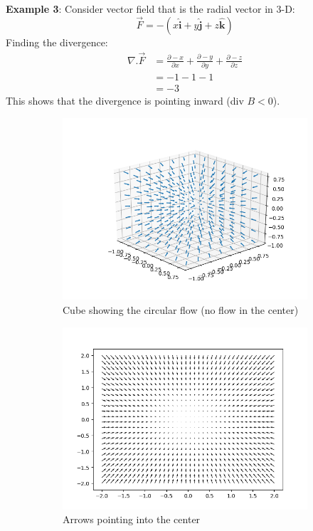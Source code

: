 \documentclass[10pt,a4paper]{article}
\begin{document}
\pagebreak

\textbf{Example 3}: Consider vector field that is the radial vector in 3-D:
$$
    \overrightarrow{F} = -(x\hat{\textbf{i}}+y\hat{\textbf{j}}+z\hat{\textbf{k}})
$$
Finding the divergence:
\begin{align*}
    \nabla.\overrightarrow{F} &= \frac{\partial -x}{\partial x} + \frac{\partial -y}{\partial y} + \frac{\partial -z}{\partial z} \\
    &= -1 - 1 - 1 \\
    &= -3
\end{align*}
This shows that the divergence is pointing inward (div $B < 0$).
\begin{figure} [h]
    \centering
    \begin{subfigure}{.5\textwidth}
      \centering
      \includegraphics[scale=0.3]{Radial_in.png}
      \caption{Cube showing the circular flow (no flow in the center)}
      \label{fig:sub1}
    \end{subfigure}%
    \begin{subfigure}{.5\textwidth}
      \centering
      \includegraphics[scale=0.3]{2D_in.png}
      \caption{Arrows pointing into the center}
      \label{fig:sub2}
    \end{subfigure}
    \caption*{}
    \label{fig:test}
\end{figure}
\end{document}
